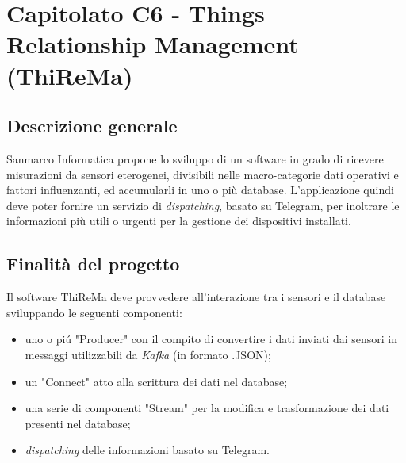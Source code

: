\section{Capitolato C6 - Things Relationship Management (ThiReMa)}

\subsection{Descrizione generale}
Sanmarco Informatica propone lo sviluppo di un software in grado di ricevere misurazioni da sensori eterogenei, divisibili nelle macro-categorie dati operativi e fattori influenzanti, ed accumularli in uno o più database. L'applicazione quindi deve poter fornire un servizio di \textit{dispatching\glos}, basato su Telegram, per inoltrare le informazioni più utili o urgenti per la gestione dei dispositivi installati.

\subsection{Finalità del progetto}
Il software ThiReMa deve provvedere all'interazione tra i sensori e il database sviluppando le seguenti componenti:
\begin{itemize}
	\item uno o piú "Producer" con il compito di convertire i dati inviati dai sensori in messaggi utilizzabili da \textit{Kafka\glo} (in formato .JSON);
	\item un "Connect" atto alla scrittura dei dati nel database;
	\item una serie di componenti "Stream" per la modifica e trasformazione dei dati presenti nel database;
	\item \textit{dispatching\glo} delle informazioni basato su Telegram.
\end{itemize}


